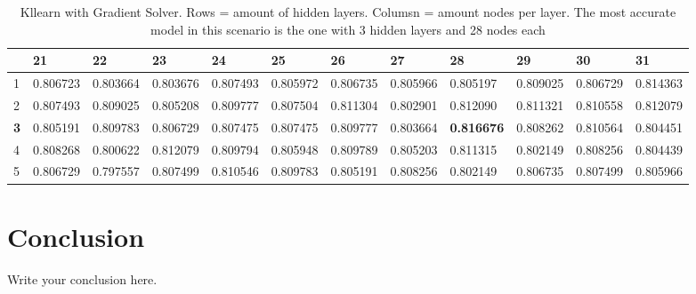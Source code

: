 \documentclass{article}
\begin{document}
\begin{table}[]
\caption{Kllearn with Gradient Solver. Rows = amount of hidden layers. Columsn = amount nodes per layer. The most accurate model in this scenario is the one with 3 hidden layers and 28 nodes each}
\label{tab:Experiment_Scaled_Gradient}
\begin{tabular}{|l|l|l|l|l|l|l|l|l|l|l|l|}
\hline
           & 21       & 22       & 23       & 24       & 25       & 26       & 27       & \textbf{28}       & 29       & 30       & 31       \\ \hline
1          & 0.806723 & 0.803664 & 0.803676 & 0.807493 & 0.805972 & 0.806735 & 0.805966 & 0.805197          & 0.809025 & 0.806729 & 0.814363 \\ \hline
2          & 0.807493 & 0.809025 & 0.805208 & 0.809777 & 0.807504 & 0.811304 & 0.802901 & 0.812090          & 0.811321 & 0.810558 & 0.812079 \\ \hline
\textbf{3} & 0.805191 & 0.809783 & 0.806729 & 0.807475 & 0.807475 & 0.809777 & 0.803664 & \textbf{0.816676} & 0.808262 & 0.810564 & 0.804451 \\ \hline
4          & 0.808268 & 0.800622 & 0.812079 & 0.809794 & 0.805948 & 0.809789 & 0.805203 & 0.811315          & 0.802149 & 0.808256 & 0.804439 \\ \hline
5          & 0.806729 & 0.797557 & 0.807499 & 0.810546 & 0.809783 & 0.805191 & 0.808256 & 0.802149          & 0.806735 & 0.807499 & 0.805966 \\ \hline
\end{tabular}
\end{table}



\section{Conclusion}
Write your conclusion here.
\end{document}
